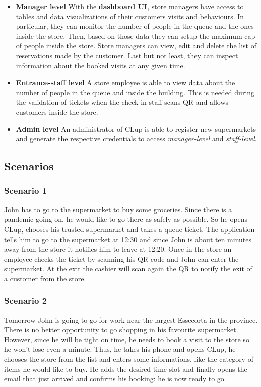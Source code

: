 \begin{itemize}
	\item \textbf{Manager level}\newline
	With the \textbf{dashboard UI}, store managers have access to tables and data visualizations of their customers visits and behaviours. In particular, they can monitor the number of people in the queue and the ones inside the store. Then, based on those data they can setup the maximum cap of people inside the store.\newline
	Store managers can view, edit and delete the list of reservations made by the customer.\newline
	Last but not least, they can inspect information about the booked visits at any given time.

	\item \textbf{Entrance-staff level}\newline
	A store employee is able to view data about the number of people in the queue and inside the building. This is needed during the validation of tickets when the check-in staff scans QR and allows customers inside the store.

    \item \textbf{Admin level}\newline
    An administrator of CLup is able to register new supermarkets and generate the respective credentials to access \textit{manager-level} and \textit{staff-level}.
\end{itemize}

	\clearpage
\subsection{Scenarios}
\subsubsection{Scenario 1}\label{sc:first}
John has to go to the supermarket to buy some groceries. Since there is a pandemic going on, he would like to go there as safely as possible.\newline
So he opens CLup, chooses his trusted supermarket and takes a queue ticket. The application tells him to go to the supermarket at 12:30 and since John is about ten minutes away from the store it notifies him to leave at 12:20. Once in the store an employee checks the ticket by scanning his QR code and John can enter the supermarket.
At the exit the cashier will scan again the QR to notify the exit of a customer from the store.
\subsubsection{Scenario 2}\label{sc:second}
Tomorrow John is going to go for work near the largest Essecorta in the province. There is no better opportunity to go shopping in his favourite supermarket.\newline
However, since he will be tight on time, he needs to book a visit to the store so he won't lose even a minute. Thus, he takes his phone and opens CLup, he chooses the store from the list and enters some informations, like the category of items he would like to buy. He adds the desired time slot and finally opens the email that just arrived and confirms his booking: he is now ready to go.
